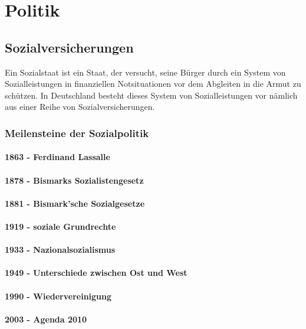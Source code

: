 \section{Politik}

\subsection{Sozialversicherungen}

Ein Sozialstaat ist ein Staat, der versucht, seine Bürger durch ein System von Sozialleistungen in finanziellen Notsituationen vor dem Abgleiten in die Armut zu schützen. In Deutschland besteht dieses System von Sozialleistungen vor nämlich aus einer Reihe von Sozialversicherungen.

\subsubsection{Meilensteine der Sozialpolitik}

\paragraph{1863 - Ferdinand Lassalle}
\paragraph{1878 - Bismarks Sozialistengesetz}
\paragraph{1881 - Bismark'sche Sozialgesetze}
\paragraph{1919 - soziale Grundrechte}
\paragraph{1933 - Nazionalsozialismus}
\paragraph{1949 - Unterschiede zwischen Ost und West}
\paragraph{1990 - Wiedervereinigung} 
\paragraph{2003 - Agenda 2010}
